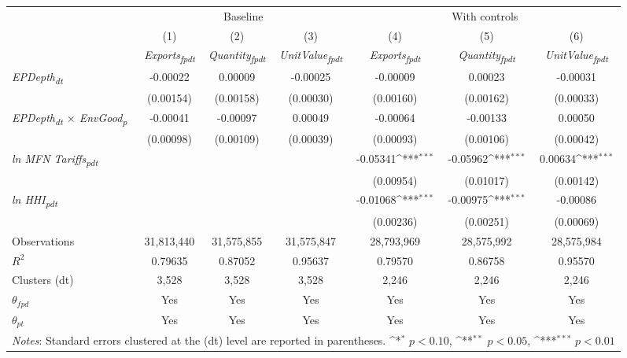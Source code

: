 {
\def\sym#1{\ifmmode^{#1}\else\(^{#1}\)\fi}
\begin{tabular}{l*{6}{c}}
\toprule
&\multicolumn{3}{c}{Baseline}&\multicolumn{3}{c}{With controls}\\\cmidrule(lr){2-4}\cmidrule(lr){5-7}
&(1)&(2)&(3)&(4)&(5)&(6)\\
&\textit{Exports\textsubscript{fpdt}}&\textit{Quantity\textsubscript{fpdt}}&\textit{UnitValue\textsubscript{fpdt}}&\textit{Exports\textsubscript{fpdt}}&\textit{Quantity\textsubscript{fpdt}}&\textit{UnitValue\textsubscript{fpdt}}\\
\midrule
\textit{EPDepth\textsubscript{dt}} & -0.00022 & 0.00009 & -0.00025 & -0.00009 & 0.00023 & -0.00031\\
 & (0.00154) & (0.00158) & (0.00030) & (0.00160) & (0.00162) & (0.00033)\\
\addlinespace
\textit{EPDepth\textsubscript{dt} $\times$ EnvGood\textsubscript{p}} & -0.00041 & -0.00097 & 0.00049 & -0.00064 & -0.00133 & 0.00050\\
 & (0.00098) & (0.00109) & (0.00039) & (0.00093) & (0.00106) & (0.00042)\\
\addlinespace
\textit{ln MFN Tariffs\textsubscript{pdt}} &  &  &  & -0.05341\sym{***} & -0.05962\sym{***} & 0.00634\sym{***}\\
 &  &  &  & (0.00954) & (0.01017) & (0.00142)\\
\addlinespace
\textit{ln HHI\textsubscript{pdt}} &  &  &  & -0.01068\sym{***} & -0.00975\sym{***} & -0.00086\\
 &  &  &  & (0.00236) & (0.00251) & (0.00069)\\
\midrule
Observations & 31,813,440 & 31,575,855 & 31,575,847 & 28,793,969 & 28,575,992 & 28,575,984\\
$R^{2}$ & 0.79635 & 0.87052 & 0.95637 & 0.79570 & 0.86758 & 0.95570\\
Clusters (dt) & 3,528 & 3,528 & 3,528 & 2,246 & 2,246 & 2,246\\
$\theta_{fpd}$ & Yes & Yes & Yes & Yes & Yes & Yes\\
$\theta_{pt}$ & Yes & Yes & Yes & Yes & Yes & Yes\\
\bottomrule
\multicolumn{7}{l}{\footnotesize \textit{Notes}: Standard errors clustered at the (dt) level are reported in parentheses. \sym{*} \(p<0.10\), \sym{**} \(p<0.05\), \sym{***} \(p<0.01\)}\\
\end{tabular}
}
